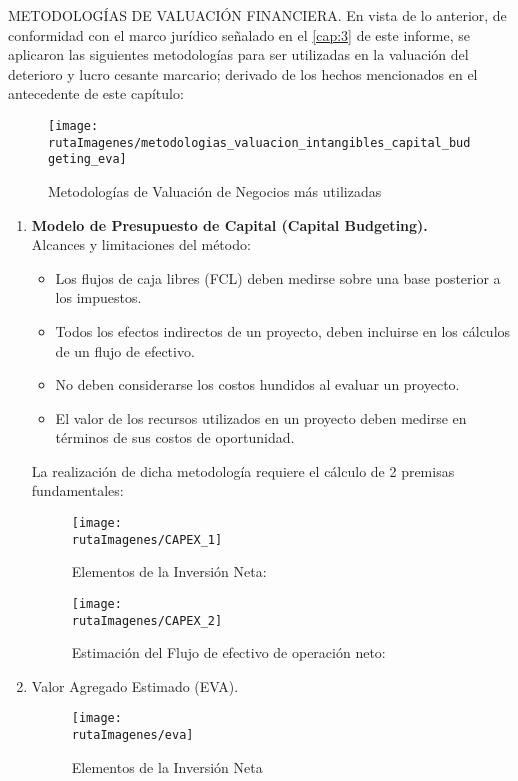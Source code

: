 

\textcolor{secundario}{METODOLOG\'IAS DE VALUACI\'ON FINANCIERA}. En vista de lo anterior, de conformidad con el marco jurídico señalado en el \autoref{cap:3} de este informe, se aplicaron las siguientes metodologías para ser utilizadas en la valuación del deterioro y lucro cesante marcario; derivado de los hechos mencionados en el antecedente de este capítulo:\\

\begin{figure}[H]
\centering
\caption{Metodolog\'ias de Valuaci\'on de Negocios m\'as utilizadas\label{fig:metodologias}}
\texttt{[image: \\rutaImagenes/metodologias\_valuacion\_intangibles\_capital\_budgeting\_eva]}\\

\end{figure}

\begin{enumerate}[1)]

\item \textbf{{\textprincipal}{Modelo de Presupuesto de Capital (Capital Budgeting).}}\\

Alcances y limitaciones del método:
\begin{itemize}

\item Los flujos de caja libres (FCL) deben medirse sobre una base posterior a los impuestos.
\item Todos los efectos indirectos de un proyecto, deben incluirse en los cálculos de un flujo de efectivo.
\item No deben considerarse los costos hundidos al evaluar un proyecto.
\item El valor de los recursos utilizados en un proyecto deben medirse en términos de sus costos de oportunidad.

\end{itemize}

La realización de dicha metodología requiere el cálculo de 2 premisas fundamentales:

\begin{figure}[H]
\centering
\caption{Elementos de la Inversión Neta:}
\texttt{[image: \\rutaImagenes/CAPEX\_1]}\\
\end{figure}

\begin{figure}[H]
\centering
\caption{Estimación del Flujo de efectivo de operación neto:}
\texttt{[image: \\rutaImagenes/CAPEX\_2]}\\
\end{figure}

\item Valor Agregado Estimado (EVA).

\begin{figure}[H]
\centering
\caption{Elementos de la Inversión Neta}
\texttt{[image: \\rutaImagenes/eva]}\\
\end{figure}


\end{enumerate}
